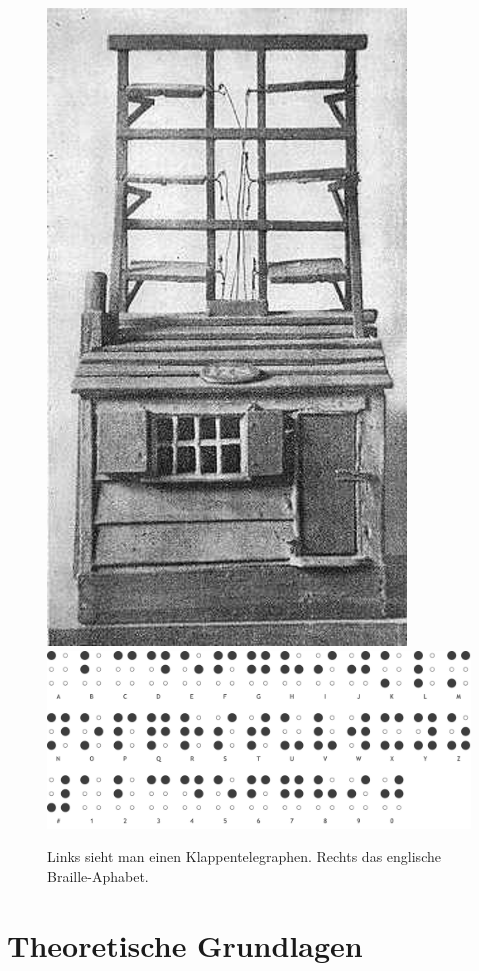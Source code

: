 \documentclass[a4paper,11pt]{scrartcl}%
\theoremstyle{change}
\theoremstyle{nonumberplain}
\theoremstyle{change}
\theoremstyle{nonumberplain}
\theoremstyle{change}
\theoremstyle{nonumberplain}
\begin{document}
	\begin{figure}[h]
	
		\includegraphics[scale=0.25]{./pics/shuttercabin}\cite{klappentelegraph}
		\hspace{25pt}
	 	\includegraphics[scale=0.17]{./pics/braille}\cite{braille}
	 	\caption{Links sieht man einen Klappentelegraphen. Rechts das englische Braille-Aphabet. }
	  	\label{fig:braille}
	\end{figure}
\newpage
\section{Theoretische Grundlagen}
\end{document}
